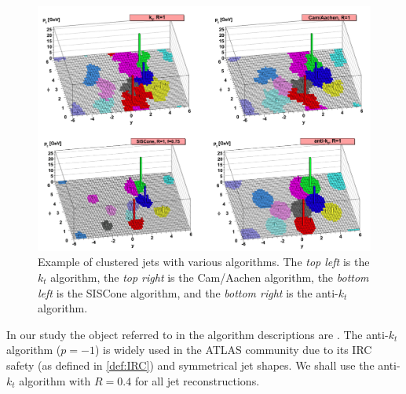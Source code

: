\begin{figure}[ht]
    \centering
    \includegraphics[width=1.\textwidth]{src/img/anitkt.png}
    \caption{Example of clustered jets with various algorithms. The \emph{top left} is the $k_t$ algorithm, the \emph{top right} is the Cam/Aachen algorithm, the \emph{bottom left} is the SISCone algorithm, and the \emph{bottom right} is the anti-$k_t$ algorithm.}
    \label{fig:jet_reco}
\end{figure}

In our study the object referred to in the algorithm descriptions are \PFOs.
The anti-$k_t$ algorithm ($p=-1$) is widely used in the ATLAS community due to its IRC safety (as defined in \cref{def:IRC}) and symmetrical jet shapes. 
We shall use the anti-$k_t$ algorithm with $R=0.4$ for all jet reconstructions.


